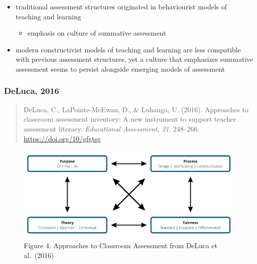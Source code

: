 \documentclass[
]{book}
\providecommand{\tightlist}{%
  \setlength{\itemsep}{0pt}\setlength{\parskip}{0pt}}
\begin{document}
\begin{itemize}
\tightlist
\item
  traditional assessment structures originated in behaviourist models of teaching and learning

  \begin{itemize}
  \tightlist
  \item
    emphasis on culture of summative assessment
  \end{itemize}
\item
  modern constructivist models of teaching and learning are less compatible with previous assessment structures, yet a culture that emphasizes summative assessment seems to persist alongside emerging models of assessment
\end{itemize}

\hypertarget{deluca-2016}{%
\subsubsection*{DeLuca, 2016}\label{deluca-2016}}

\begin{quote}
DeLuca, C., LaPointe-McEwan, D., \& Luhanga, U. (2016). Approaches to classroom assessment inventory: A new instrument to support teacher assessment literacy. \emph{Educational Assessment, 21}, 248--266. \url{https://doi.org/10/gfgtsg}
\end{quote}

\begin{figure}
\centering
\includegraphics{assets/otessa22/approaches.png}
\caption{Figure 4. Approaches to Classroom Assessment from DeLuca et al.~(2016)}
\end{figure}
\end{document}
